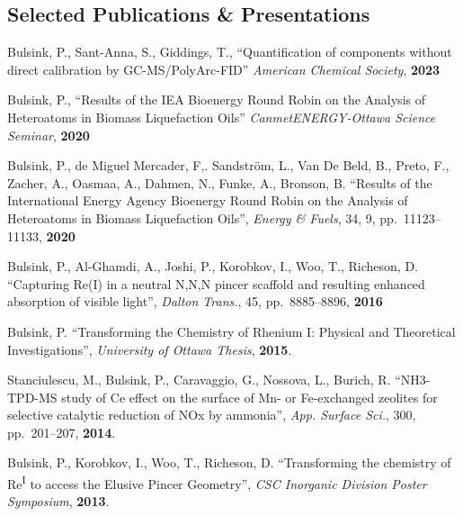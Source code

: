 \documentclass[margin,line]{resumecls}
\begin{document}
\begin{resume}
    \section{\mysidestyle Selected Publications \& Presentations}\label{sec:mysidestyle-selected-publications-&-presentations}
    Bulsink, P., Sant-Anna, S., Giddings, T., ``Quantification of components without direct calibration by GC-MS/PolyArc\textsuperscript \textregistered-FID'' \textit{American Chemical Society}, \textbf{2023}

    \vspace{0mm}
    Bulsink, P., ``Results of the IEA Bioenergy Round Robin on the Analysis of Heteroatoms in Biomass Liquefaction Oils'' \textit{CanmetENERGY-Ottawa Science Seminar}, \textbf{2020}

    \vspace{0mm}
    Bulsink, P., de Miguel Mercader, F,. Sandström, L., Van De Beld, B., Preto, F., Zacher, A., Oasmaa, A., Dahmen, N., Funke, A., Bronson, B. ``Results of the International Energy Agency Bioenergy Round Robin on the Analysis of Heteroatoms in Biomass Liquefaction Oils'', \textit{Energy \& Fuels}, 34, 9, pp.\ 11123--11133, \textbf{2020}

    \vspace{0mm}
    Bulsink, P., Al-Ghamdi, A., Joshi, P., Korobkov, I., Woo, T., Richeson, D. ``Capturing Re(I) in a neutral N,N,N pincer scaffold and resulting enhanced absorption of visible light'', \textit{Dalton Trans.}, 45, pp.\ 8885--8896, \textbf{2016}

     \vspace{0mm}
    Bulsink, P. ``Transforming the Chemistry of Rhenium I: Physical and Theoretical Investigations'', \textit{University of Ottawa Thesis}, \textbf{2015}.

 	\vspace{0mm}
    Stanciulescu, M., Bulsink, P., Caravaggio, G., Nossova, L., Burich, R. ``NH3-TPD-MS study of Ce effect on the surface of Mn- or Fe-exchanged zeolites for selective catalytic reduction of NOx by ammonia'', \textit{App. Surface Sci.}, 300, pp.\ 201--207, \textbf{2014}.

	\vspace{0mm}
    Bulsink, P., Korobkov, I., Woo, T., Richeson, D. ``Transforming the chemistry of Re\textsuperscript{I} to access the Elusive Pincer Geometry'', \textit{CSC Inorganic Division Poster Symposium}, \textbf{2013}.


\end{resume}
\end{document}
